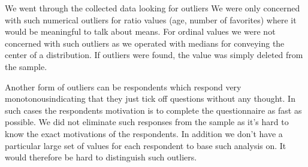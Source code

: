 We went through the collected data looking for outliers
\dash{}
We were only concerned with such numerical outliers for ratio values
(age, number of favorites) where it would be meaningful to talk about means.
For ordinal values we were not concerned with such outliers as we operated
with medians for conveying the center of a distribution.
If outliers were found, the value was simply deleted from the sample.

Another form of outliers can be respondents which respond very
monotonous\dash{}indicating that they just tick off questions without any
thought. In such cases the respondents motivation is to complete the
questionnaire as fast as possible. We did not eliminate such responses from
the sample as it's hard to know the exact motivations of the respondents.
In addition we don't have a particular large set of values for each respondent
to base such analysis on. It would therefore be hard to distinguish such
outliers.
